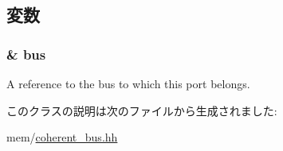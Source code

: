 \subsection{変数}
\hypertarget{classCoherentBus_1_1CoherentBusSlavePort_a3fedef8f1565149424b7e0e4772fe8c9}{
\subsubsection[{bus}]{\& {\bf bus}}}
\label{classCoherentBus_1_1CoherentBusSlavePort_a3fedef8f1565149424b7e0e4772fe8c9}
A reference to the bus to which this port belongs. 

このクラスの説明は次のファイルから生成されました:\begin{DoxyCompactItemize}
\item 
mem/\hyperlink{coherent__bus_8hh}{coherent\_\-bus.hh}\end{DoxyCompactItemize}
